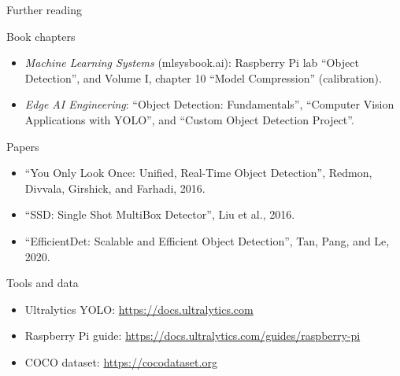 \begin{frame}{Further reading}
  \footnotesize
  \begin{block}{Book chapters}
    \begin{itemize}
      \item \emph{Machine Learning Systems} (mlsysbook.ai): Raspberry Pi lab
            ``Object Detection'', and Volume I, chapter 10 ``Model
            Compression'' (calibration).
      \item \emph{Edge AI Engineering}: ``Object Detection: Fundamentals'',
            ``Computer Vision Applications with YOLO'', and ``Custom Object
            Detection Project''.
    \end{itemize}
  \end{block}
  \begin{block}{Papers}
    \begin{itemize}
      \item ``You Only Look Once: Unified, Real-Time Object Detection'',
            Redmon, Divvala, Girshick, and Farhadi, 2016.
      \item ``SSD: Single Shot MultiBox Detector'', Liu et al., 2016.
      \item ``EfficientDet: Scalable and Efficient Object Detection'', Tan,
            Pang, and Le, 2020.
    \end{itemize}
  \end{block}
  \begin{block}{Tools and data}
    \begin{itemize}
      \item Ultralytics YOLO: \url{https://docs.ultralytics.com}
      \item Raspberry Pi guide:
            \url{https://docs.ultralytics.com/guides/raspberry-pi}
      \item COCO dataset: \url{https://cocodataset.org}
    \end{itemize}
  \end{block}
\end{frame}
